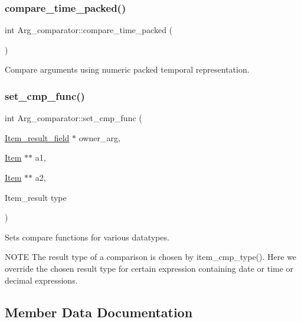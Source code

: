\subsubsection{\texorpdfstring{compare\+\_\+time\+\_\+packed()}{compare\_time\_packed()}}
{\footnotesize\ttfamily int Arg\+\_\+comparator\+::compare\+\_\+time\+\_\+packed (\begin{DoxyParamCaption}{ }\end{DoxyParamCaption})}

Compare arguments using numeric packed temporal representation. \mbox{\label{classArg__comparator_aafa1b31ab84277b8cd2d4c798b0147e3}} 
\subsubsection{\texorpdfstring{set\+\_\+cmp\+\_\+func()}{set\_cmp\_func()}}
{\footnotesize\ttfamily int Arg\+\_\+comparator\+::set\+\_\+cmp\+\_\+func (\begin{DoxyParamCaption}\item[{\mbox{\hyperlink{classItem__result__field}{Item\+\_\+result\+\_\+field}} $\ast$}]{owner\+\_\+arg,  }\item[{\mbox{\hyperlink{classItem}{Item}} $\ast$$\ast$}]{a1,  }\item[{\mbox{\hyperlink{classItem}{Item}} $\ast$$\ast$}]{a2,  }\item[{Item\+\_\+result}]{type }\end{DoxyParamCaption})}

Sets compare functions for various datatypes.

N\+O\+TE The result type of a comparison is chosen by item\+\_\+cmp\+\_\+type(). Here we override the chosen result type for certain expression containing date or time or decimal expressions. 

\subsection{Member Data Documentation}
\mbox{\label{classArg__comparator_a452d3694331e24581ed902de900823d5}} 
